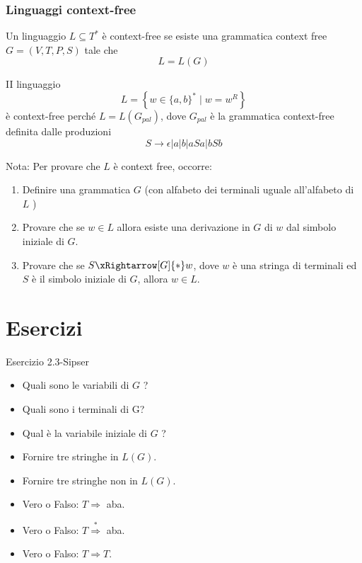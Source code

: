 \subsubsection{Linguaggi context-free}
Un linguaggio $L \subseteq T^{*}$ è context-free se esiste una grammatica context free $G=(V, T, P, S)$ tale che
$$
L=L(G)
$$

II linguaggio
$$
L=\left\{w \in\{a, b\}^{*} \mid w=w^{R}\right\}
$$
è context-free perché $L=L\left(G_{p a l}\right)$, dove $G_{p a l}$ è la grammatica context-free definita dalle produzioni
$$
S \rightarrow \epsilon|a| b|a S a| b S b
$$

Nota: Per provare che $L$ è context free, occorre:
\begin{enumerate}
\item  Definire una grammatica $G$ (con alfabeto dei terminali uguale all'alfabeto di $L$ )
\item Provare che se $w \in L$ allora esiste una derivazione in $G$ di $w$ dal simbolo iniziale di $G$.
\item Provare che se $S \xRightarrow[G]{*} w$, dove $w$ è una stringa di terminali ed $S$ è il simbolo iniziale di $G$, allora $w \in L .$
\end{enumerate}

\section{Esercizi}

Esercizio 2.3-Sipser
\begin{itemize}
    \item Quali sono le variabili di $G$ ?
\item Quali sono i terminali di G?
\item Qual è la variabile iniziale di $G$ ?
\item Fornire tre stringhe in $L(G)$.
\item Fornire tre stringhe non in $L(G)$.
\item Vero o Falso: $T \Rightarrow$ aba.
\item Vero o Falso: $T \stackrel{*}{\Rightarrow}$ aba.
\item Vero o Falso: $T \Rightarrow T$.
\end{itemize}

